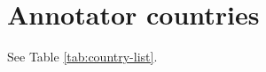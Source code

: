 \documentclass[10pt]{article} %
\begin{document}
\section{Annotator countries}
\label{sec:countries}
See Table \ref{tab:country-list}. 
\end{document}
